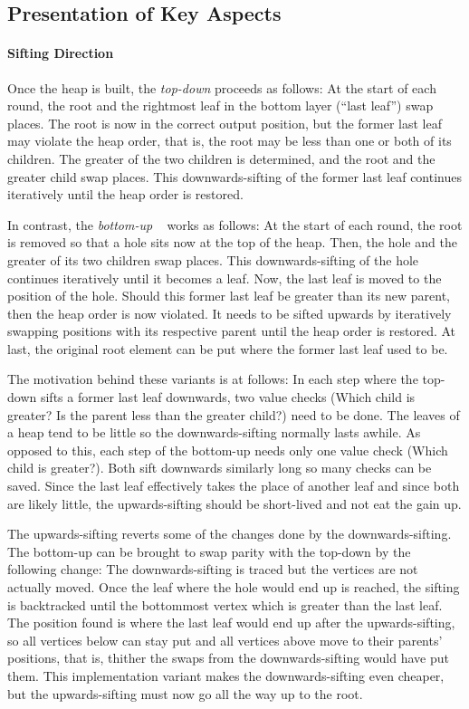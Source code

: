 \subsection{Presentation of Key Aspects}
\label{sec:tasklet:heap:aspects}

\paragraph{Sifting Direction}
Once the heap is built, the \emph{top-down} \HS{} proceeds as follows:
At the start of each round, the root and the rightmost leaf in the bottom layer (\enquote{last leaf}) swap places.
The root is now in the correct output position, but the former last leaf may violate the heap order, that is, the root may be less than one or both of its children.
The greater of the two children is determined, and the root and the greater child swap places.
This downwards-sifting of the former last leaf continues iteratively until the heap order is restored.

In contrast, the \emph{bottom-up} \HS{}~\cite{wegener1993heapsort} works as follows:
At the start of each round, the root is removed so that a hole sits now at the top of the heap.
Then, the hole and the greater of its two children swap places.
This downwards-sifting of the hole continues iteratively until it becomes a leaf.
Now, the last leaf is moved to the position of the hole.
Should this former last leaf be greater than its new parent, then the heap order is now violated.
It needs to be sifted upwards by iteratively swapping positions with its respective parent until the heap order is restored.
At last, the original root element can be put where the former last leaf used to be.

The motivation behind these variants is at follows:
In each step where the top-down \HS{} sifts a former last leaf downwards, two value checks (Which child is greater? Is the parent less than the greater child?) need to be done.
The leaves of a heap tend to be little so the downwards-sifting normally lasts awhile.
As opposed to this, each step of the bottom-up \HS{} needs only one value check (Which child is greater?).
Both \HS*{} sift downwards similarly long so many checks can be saved.
Since the last leaf effectively takes the place of another leaf and since both are likely little, the upwards-sifting should be short-lived and not eat the gain up.

The upwards-sifting reverts some of the changes done by the downwards-sifting.
The bottom-up \HS{} can be brought to swap parity with the top-down \HS{} by the following change:
The downwards-sifting is traced but the vertices are not actually moved.
Once the leaf where the hole would end up is reached, the sifting is backtracked until the bottommost vertex which is greater than the last leaf.
The position found is where the last leaf would end up after the upwards-sifting, so all vertices below can stay put and all vertices above move to their parents' positions, that is, thither the swaps from the downwards-sifting would have put them.
This implementation variant makes the downwards-sifting even cheaper, but the upwards-sifting must now go all the way up to the root.


